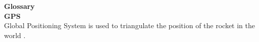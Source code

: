 {\fontsize{14}{14}\selectfont \textbf{Glossary}}\\

\textbf{GPS}\\
Global Positioning System is used to triangulate the position of the rocket in the world \cite{GPS}.\\

